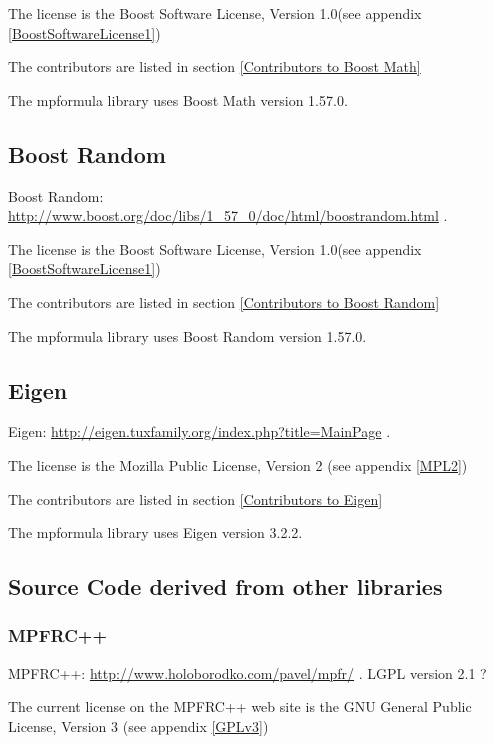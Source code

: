 The license is the Boost Software License, Version 1.0(see appendix \ref{BoostSoftwareLicense1})

The contributors are listed in section \ref{Contributors to Boost Math}

The mpformula library uses Boost Math version 1.57.0.



\subsection{Boost Random}
Boost Random: \href{http://www.boost.org/doc/libs/1_57_0/doc/html/boost_random.html}{http://www.boost.org/doc/libs/1\_57\_0/doc/html/boostrandom.html} . 

The license is the Boost Software License, Version 1.0(see appendix \ref{BoostSoftwareLicense1})

The contributors are listed in section \ref{Contributors to Boost Random}

The mpformula library uses Boost Random version 1.57.0.



\subsection{Eigen}
Eigen: \href{http://eigen.tuxfamily.org/index.php?title=Main_Page}{http://eigen.tuxfamily.org/index.php?title=MainPage} . 

The license is the Mozilla Public License, Version 2 (see appendix \ref{MPL2})

The contributors are listed in section \ref{Contributors to Eigen}

The mpformula library uses Eigen version 3.2.2.




\subsection{Source Code derived from other libraries}

\subsubsection{MPFRC++}
MPFRC++: \href{http://www.holoborodko.com/pavel/mpfr/}{http://www.holoborodko.com/pavel/mpfr/} . LGPL version 2.1 ?

The current license on the MPFRC++ web site is the GNU General Public License, Version 3 (see appendix \ref{GPLv3})

